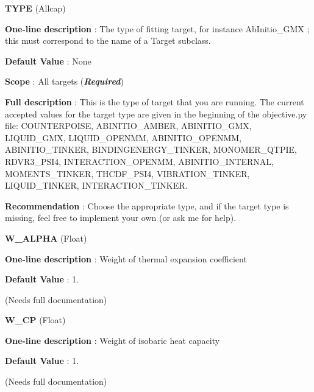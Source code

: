 \begin{DoxyItemize}
\item {\bfseries  T\-Y\-P\-E } (Allcap) \par
{\bfseries  One-\/line description }\-: The type of fitting target, for instance Ab\-Initio\-\_\-\-G\-M\-X ; this must correspond to the name of a Target subclass. \par
{\bfseries  Default Value }\-: None \par
{\bfseries  Scope }\-: All targets ({\bfseries {\itshape Required}}) \par
{\bfseries  Full description }\-: This is the type of target that you are running. The current accepted values for the target type are given in the beginning of the objective.\-py file\-: C\-O\-U\-N\-T\-E\-R\-P\-O\-I\-S\-E, A\-B\-I\-N\-I\-T\-I\-O\-\_\-\-A\-M\-B\-E\-R, A\-B\-I\-N\-I\-T\-I\-O\-\_\-\-G\-M\-X, L\-I\-Q\-U\-I\-D\-\_\-\-G\-M\-X, L\-I\-Q\-U\-I\-D\-\_\-\-O\-P\-E\-N\-M\-M, A\-B\-I\-N\-I\-T\-I\-O\-\_\-\-O\-P\-E\-N\-M\-M, A\-B\-I\-N\-I\-T\-I\-O\-\_\-\-T\-I\-N\-K\-E\-R, B\-I\-N\-D\-I\-N\-G\-E\-N\-E\-R\-G\-Y\-\_\-\-T\-I\-N\-K\-E\-R, M\-O\-N\-O\-M\-E\-R\-\_\-\-Q\-T\-P\-I\-E, R\-D\-V\-R3\-\_\-\-P\-S\-I4, I\-N\-T\-E\-R\-A\-C\-T\-I\-O\-N\-\_\-\-O\-P\-E\-N\-M\-M, A\-B\-I\-N\-I\-T\-I\-O\-\_\-\-I\-N\-T\-E\-R\-N\-A\-L, M\-O\-M\-E\-N\-T\-S\-\_\-\-T\-I\-N\-K\-E\-R, T\-H\-C\-D\-F\-\_\-\-P\-S\-I4, V\-I\-B\-R\-A\-T\-I\-O\-N\-\_\-\-T\-I\-N\-K\-E\-R, L\-I\-Q\-U\-I\-D\-\_\-\-T\-I\-N\-K\-E\-R, I\-N\-T\-E\-R\-A\-C\-T\-I\-O\-N\-\_\-\-T\-I\-N\-K\-E\-R. \par
{\bfseries  Recommendation }\-: Choose the appropriate type, and if the target type is missing, feel free to implement your own (or ask me for help).\end{DoxyItemize}
\begin{DoxyItemize}
\item {\bfseries  W\-\_\-\-A\-L\-P\-H\-A } (Float) \par
{\bfseries  One-\/line description }\-: Weight of thermal expansion coefficient \par
{\bfseries  Default Value }\-: 1. \par
(Needs full documentation)\end{DoxyItemize}
\begin{DoxyItemize}
\item {\bfseries  W\-\_\-\-C\-P } (Float) \par
{\bfseries  One-\/line description }\-: Weight of isobaric heat capacity \par
{\bfseries  Default Value }\-: 1. \par
(Needs full documentation)\end{DoxyItemize}
